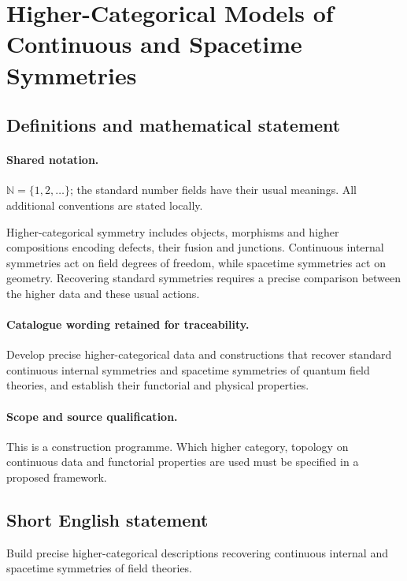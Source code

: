 \documentclass[11pt]{article}
\begin{document}
\section{Higher-Categorical Models of Continuous and Spacetime Symmetries}\label{statement}

\subsection{Definitions and mathematical statement}

\paragraph{Shared notation.}$\mathbb N=\{1,2,\ldots\}$; the standard number fields have their usual meanings. All additional conventions are stated locally.


Higher-categorical symmetry includes objects, morphisms and higher compositions encoding defects, their fusion and junctions. Continuous internal symmetries act on field degrees of freedom, while spacetime symmetries act on geometry. Recovering standard symmetries requires a precise comparison between the higher data and these usual actions.

\paragraph{Catalogue wording retained for traceability.}
Develop precise higher-categorical data and constructions that recover standard continuous internal symmetries and spacetime symmetries of quantum field theories, and establish their functorial and physical properties.

\paragraph{Scope and source qualification.}This is a construction programme. Which higher category, topology on continuous data and functorial properties are used must be specified in a proposed framework.
\subsection{Short English statement}
Build precise higher-categorical descriptions recovering continuous internal and spacetime symmetries of field theories.
\end{document}
